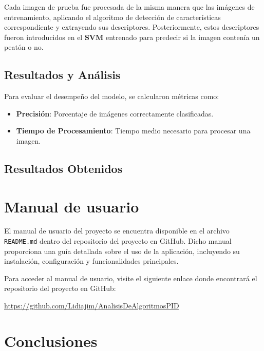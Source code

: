 \documentclass[a4paper]{article}
\begin{document}
Cada imagen de prueba fue procesada de la misma manera que las imágenes de entrenamiento, aplicando el algoritmo de detección de características correspondiente y extrayendo sus descriptores. Posteriormente, estos descriptores fueron introducidos en el \textbf{SVM} entrenado para predecir si la imagen contenía un peatón o no.

\subsection{Resultados y Análisis}

Para evaluar el desempeño del modelo, se calcularon métricas como:
\begin{itemize}
    \item \textbf{Precisión}: Porcentaje de imágenes correctamente clasificadas.
    \item \textbf{Tiempo de Procesamiento}: Tiempo medio necesario para procesar una imagen.
\end{itemize}


\subsection{Resultados Obtenidos}


\newpage

\section{Manual de usuario}

El manual de usuario del proyecto se encuentra disponible en el archivo \texttt{README.md} dentro del repositorio del proyecto en GitHub. Dicho manual proporciona una guía detallada sobre el uso de la aplicación, incluyendo su instalación, configuración y funcionalidades principales.
\par\hspace{1cm}

Para acceder al manual de usuario, visite el siguiente enlace donde encontrará el repositorio del proyecto en GitHub:

\begin{center}
\url{https://github.com/Lidiajim/AnalisisDeAlgoritmosPID}
\end{center}
\newpage

\section{Conclusiones}
\end{document}
